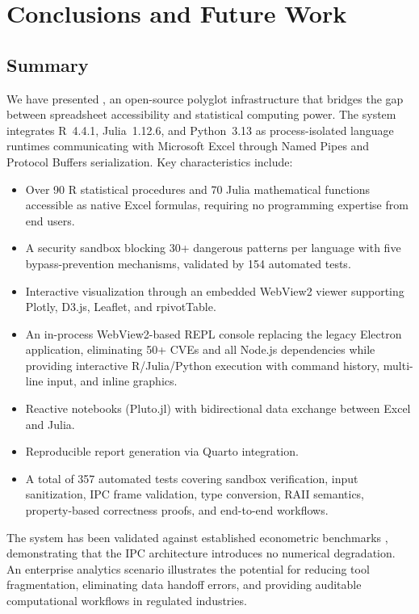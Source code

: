 
\section{Conclusions and Future Work}
\label{sec:conclusion}

\subsection{Summary}

We have presented \neven{}, an open-source polyglot infrastructure that bridges the gap between spreadsheet accessibility and statistical computing power. The system integrates R~4.4.1, Julia~1.12.6, and Python~3.13 as process-isolated language runtimes communicating with Microsoft Excel through Named Pipes and Protocol Buffers serialization. Key characteristics include:

\begin{itemize}
    \item Over 90 R statistical procedures and 70 Julia mathematical functions accessible as native Excel formulas, requiring no programming expertise from end users.
    \item A security sandbox blocking 30+ dangerous patterns per language with five bypass-prevention mechanisms, validated by 154 automated tests.
    \item Interactive visualization through an embedded WebView2 viewer supporting Plotly, D3.js, Leaflet, and rpivotTable.
    \item An in-process WebView2-based REPL console replacing the legacy Electron application, eliminating 50+ CVEs and all Node.js dependencies while providing interactive R/Julia/Python execution with command history, multi-line input, and inline graphics.
    \item Reactive notebooks (Pluto.jl) with bidirectional data exchange between Excel and Julia.
    \item Reproducible report generation via Quarto integration.
    \item A total of 357 automated tests covering sandbox verification, input sanitization, IPC frame validation, type conversion, RAII semantics, property-based correctness proofs, and end-to-end workflows.
\end{itemize}

The system has been validated against established econometric benchmarks \citep{Wooldridge2016}, demonstrating that the IPC architecture introduces no numerical degradation. An enterprise analytics scenario illustrates the potential for reducing tool fragmentation, eliminating data handoff errors, and providing auditable computational workflows in regulated industries.

